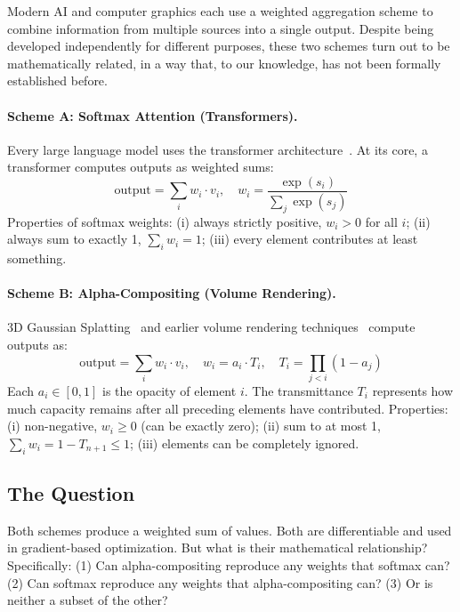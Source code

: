 \documentclass[twoside,11pt]{article}
\begin{document}
Modern AI and computer graphics each use a weighted aggregation scheme to combine information from multiple sources into a single output. Despite being developed independently for different purposes, these two schemes turn out to be mathematically related, in a way that, to our knowledge, has not been formally established before.

\paragraph{Scheme A: Softmax Attention (Transformers).}
Every large language model uses the transformer architecture~\citep{vaswani2017}. At its core, a transformer computes outputs as weighted sums:
\begin{equation}
\text{output} = \sum_i w_i \cdot v_i, \quad w_i = \frac{\exp(s_i)}{\sum_j \exp(s_j)}
\end{equation}
Properties of softmax weights: (i) always strictly positive, $w_i > 0$ for all $i$; (ii) always sum to exactly 1, $\sum_i w_i = 1$; (iii) every element contributes at least something.

\paragraph{Scheme B: Alpha-Compositing (Volume Rendering).}
3D Gaussian Splatting~\citep{kerbl2023} and earlier volume rendering techniques~\citep{porter1984,max1995,mildenhall2020} compute outputs as:
\begin{equation}
\text{output} = \sum_i w_i \cdot v_i, \quad w_i = a_i \cdot T_i, \quad T_i = \prod_{j < i}(1 - a_j)
\end{equation}
Each $a_i \in [0,1]$ is the opacity of element $i$. The transmittance $T_i$ represents how much capacity remains after all preceding elements have contributed. Properties: (i) non-negative, $w_i \geq 0$ (can be exactly zero); (ii) sum to at most 1, $\sum_i w_i = 1 - T_{n+1} \leq 1$; (iii) elements can be completely ignored.

\subsection{The Question}

Both schemes produce a weighted sum of values. Both are differentiable and used in gradient-based optimization. But what is their mathematical relationship? Specifically: (1) Can alpha-compositing reproduce any weights that softmax can? (2) Can softmax reproduce any weights that alpha-compositing can? (3) Or is neither a subset of the other?
\end{document}
